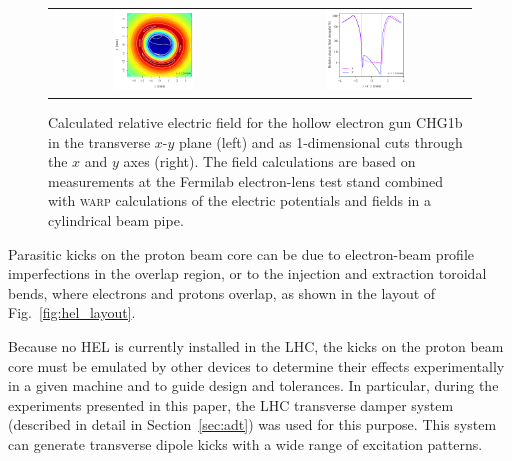 \documentclass[aps
,prstab
,reprint
,longbibliography
,preprintnumbers
,showkeys
,amsfonts,amssymb,amsmath
,floatfix
]{revtex4-1}
\newcommand{\code}[1]{\textsc{#1}} %
\begin{document}
\begin{figure}
  \begin{tabular}{cc}
    \includegraphics[width=0.4\textwidth]{CHG1b_170512_8p75A_2-4-2p7kG_500V_76mA_hires_Emap} &
    \includegraphics[width=0.4\textwidth]{CHG1b_170512_8p75A_2-4-2p7kG_500V_76mA_hires_Eslice}\\
  \end{tabular}
  \caption{Calculated relative electric field for the hollow electron
    gun CHG1b in the transverse $x$-$y$ plane (left) and as
    1-dimensional cuts through the $x$ and $y$ axes (right). The field
    calculations are based on measurements at the Fermilab
    electron-lens test stand combined with \code{warp} calculations of
    the electric potentials and fields in a cylindrical beam pipe.}
  \label{core:fig:1}
\end{figure}

Parasitic kicks on the proton beam core can be due to electron-beam
profile imperfections in the overlap region, or to the injection and
extraction toroidal bends, where electrons and protons overlap, as
shown in the layout of Fig.~\ref{fig:hel_layout}.

Because no HEL is currently installed in the LHC, the kicks on the
proton beam core must be emulated by other devices to determine their
effects experimentally in a given machine and to guide design and
tolerances. In particular, during the experiments presented in this
paper, the LHC transverse damper system (described in detail in
Section~\ref{sec:adt}) was used for this purpose. This system can
generate transverse dipole kicks with a wide range of excitation
patterns.
\end{document}
